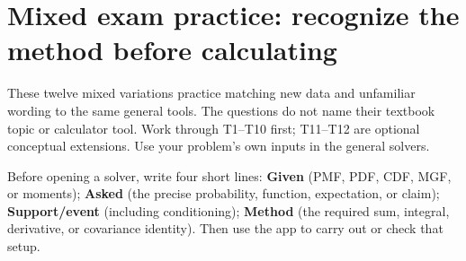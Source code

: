 \section{Mixed exam practice: recognize the method before calculating}
\label{sec:transfer-practice}
These twelve mixed variations practice matching new data and unfamiliar wording to the same general tools. The questions do not name their textbook topic or calculator tool. Work through T1--T10 first; T11--T12 are optional conceptual extensions. Use your problem's own inputs in the general solvers.

Before opening a solver, write four short lines: \textbf{Given} (PMF, PDF, CDF, MGF, or moments); \textbf{Asked} (the precise probability, function, expectation, or claim); \textbf{Support/event} (including conditioning); \textbf{Method} (the required sum, integral, derivative, or covariance identity). Then use the app to carry out or check that setup.


